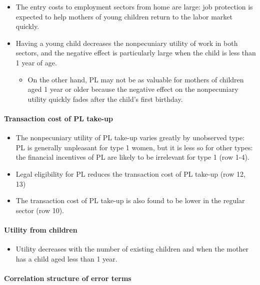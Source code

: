 \documentclass[../root]{subfiles}
\begin{document}
    \begin{itemize}
      \item The entry costs to employment sectors from home are large: job protection is expected to help mothers of young children return to the labor market quickly.
      \item Having a young child decreases the nonpecuniary utility of work in both sectors, and the negative effect is particularly large when the child is less than 1 year of age.
      \begin{itemize}
        \item On the other hand, PL may not be as valuable for mothers of children aged 1 year or older because the negative effect on the nonpecuniary utility quickly fades after the child’s first birthday.
      \end{itemize}
    \end{itemize}

    \paragraph{Transaction cost of PL take-up}

    \begin{itemize}
      \item The nonpecuniary utility of PL take-up varies greatly by unobserved type: PL is generally unpleasant for type 1 women, but it is less so for other types: the financial incentives of PL are likely to be irrelevant for type 1 (row 1-4).
      \item Legal eligibility for PL reduces the transaction cost of PL take-up (row 12, 13)
      \item The transaction cost of PL take-up is also found to be lower in the regular sector (row 10).
    \end{itemize}

    \paragraph{Utility from children}

    \begin{itemize}
      \item Utility decreases with the number of existing children and when the mother has a child aged less than 1 year.
    \end{itemize}

    \paragraph{Correlation structure of error terms}
\end{document}
